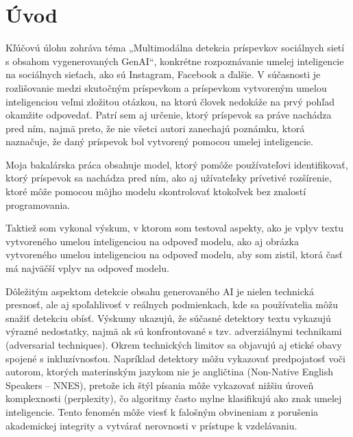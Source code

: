 \setcounter{page}{1}
\setcounter{equation}{0}
\setcounter{figure}{0}
\setcounter{table}{0}

\section*{Úvod}
Kľúčovú úlohu zohráva téma „Multimodálna detekcia príspevkov sociálnych sietí s obsahom vygenerovaných GenAI“, konkrétne rozpoznávanie umelej inteligencie na sociálnych sieťach, ako sú Instagram, Facebook a ďalšie. V súčasnosti je rozlišovanie medzi skutočným príspevkom a príspevkom vytvoreným umelou inteligenciou veľmi zložitou otázkou, na ktorú človek nedokáže na prvý pohľad okamžite odpovedať. Patrí sem aj určenie, ktorý príspevok sa práve nachádza pred ním, najmä preto, že nie všetci autori zanechajú poznámku, ktorá naznačuje, že daný príspevok bol vytvorený pomocou umelej inteligencie. 

Moja bakalárska práca obsahuje model, ktorý pomôže používateľovi identifikovať, ktorý príspevok sa nachádza pred ním, ako aj užívateľsky prívetivé rozšírenie, ktoré môže pomocou môjho modelu skontrolovať ktokoľvek bez znalostí programovania. 

Taktiež som vykonal výskum, v ktorom som testoval aspekty, ako je vplyv textu vytvoreného umelou inteligenciou na odpoveď modelu, ako aj obrázka vytvoreného umelou inteligenciou na odpoveď modelu, aby som zistil, ktorá časť má najväčší vplyv na odpoveď modelu.

Dôležitým aspektom detekcie obsahu generovaného AI je nielen technická presnosť, ale aj spoľahlivosť v reálnych podmienkach, kde sa používatelia môžu snažiť detekciu obísť. Výskumy ukazujú, že súčasné detektory textu vykazujú výrazné nedostatky, najmä ak sú konfrontované s tzv. adverziálnymi technikami (adversarial techniques). Okrem technických limitov sa objavujú aj etické obavy spojené s inkluzívnosťou. Napríklad detektory môžu vykazovať predpojatosť voči autorom, ktorých materinským jazykom nie je angličtina (Non-Native English Speakers – NNES), pretože ich štýl písania môže vykazovať nižšiu úroveň komplexnosti (perplexity), čo algoritmy často mylne klasifikujú ako znak umelej inteligencie. Tento fenomén môže viesť k falošným obvineniam z porušenia akademickej integrity a vytvárať nerovnosti v prístupe k vzdelávaniu.